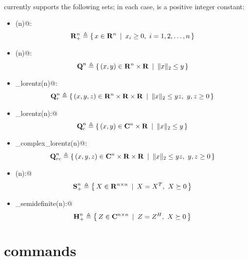 \documentclass[12pt]{article}
\newcommand{\symm}{{\mbox{\bf S}}}  %
\newcommand{\herm}{{\mbox{\bf H}}}  %
\newcommand{\lorentz}{{\mbox{\bf Q}}}  %
\begin{document}
\cvx currently supports the following sets; in each case, \verb@n@ is a positive
integer constant:
\begin{itemize}
\item \verb@nonnegative(n)@:
\begin{equation*}
	\mathbf{R}^n_+ \triangleq \left\{\,x\in\mathbf{R}^{n}\,~|~\,x_i\geq 0,~i=1,2,\dots,n\,\right\}
\end{equation*}	
\item \verb@lorentz(n)@:
\begin{equation*}
\lorentz^n \eqbydef \Condset{(x,y)\in\R^n\times\R}{\|x\|_2\leq y}
\end{equation*}
\item \verb@rotated_lorentz(n)@: 
\begin{equation*}
\lorentz^n_r \eqbydef \Condset{(x,y,z)\in\R^n\times\R\times\R}{\|x\|_2\leq yz,~y,z\geq 0}
\end{equation*}
\item \verb@complex_lorentz(n):@ 
\begin{equation*}
\lorentz^n_c \eqbydef \Condset{(x,y)\in\complex^n\times\R}{\|x\|_2\leq y}
\end{equation*}
\item \verb@rotated_complex_lorentz(n)@: 
\begin{equation*}
\lorentz^n_{rc} \eqbydef \Condset{(x,y,z)\in\complex^n\times\R\times\R}{\|x\|_2\leq yz,~y,z\geq 0}
\end{equation*}
\item \verb@semidefinite(n):@ 
\begin{equation*}
\symm^n_+ \eqbydef \Condset{X\in\R^{n\times n}}{X=X^T,~X\succeq 0}
\end{equation*}
\item \verb@hermitian_semidefinite(n):@ 
\begin{equation*}
\herm^n_+ \eqbydef \Condset{Z\in\complex^{n\times n}}{Z=Z^H,~X\succeq 0}
\end{equation*}
\end{itemize}

\section{\cvx commands}
\end{document}
